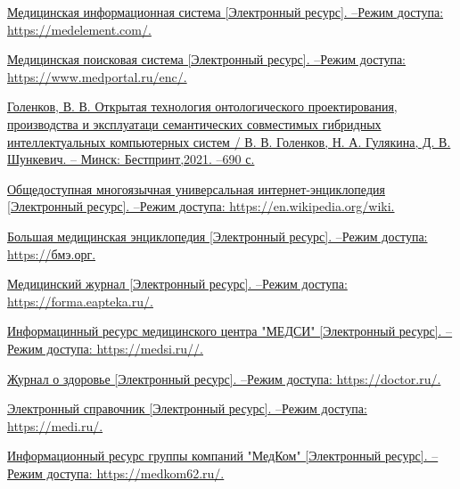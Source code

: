 %
%
%

\begin{thebibliography}{99}
	
	\href{https://medelement.com/}{Медицинская информационная система [Электронный ресурс]. --Режим доступа: https://medelement.com/.}
	
	\href{https://www.medportal.ru/enc/.}{Медицинская поисковая система [Электронный ресурс]. --Режим доступа: https://www.medportal.ru/enc/.}
	
	\href{}{Голенков, В. В. Открытая технология онтологического проектирования, производства и эксплуатаци семантических совместимых гибридных интеллектуальных компьютерных систем / В. В. Голенков, Н. А. Гулякина, Д. В. Шункевич. -- Минск: Бестпринт,2021. --690 с.}
	
	\href{https://en.wikipedia.org/wiki.}{Общедоступная многоязычная универсальная интернет-энциклопедия [Электронный ресурс]. --Режим доступа: https://en.wikipedia.org/wiki.}
	
	\href{https://бмэ.орг.}{Большая медицинская энциклопедия [Электронный ресурс]. --Режим доступа: https://бмэ.орг.}
	
	\href{https://forma.eapteka.ru/}{Медицинский журнал [Электронный ресурс]. --Режим доступа: https://forma.eapteka.ru/.}
	
	\href{https://medsi.ru/}{Информацинный ресурс медицинского центра "МЕДСИ" [Электронный ресурс]. --Режим доступа: https://medsi.ru//.}
	
	\href{https://doctor.ru/}{Журнал о здоровье [Электронный ресурс]. --Режим доступа: https://doctor.ru/.}
	
	\href{https://medi.ru/}{Электронный справочник [Электронный ресурс]. --Режим доступа: https://medi.ru/.}
	
	\href{https://medkom62.ru/}{Информационный ресурс группы компаний "МедКом" [Электронный ресурс]. --Режим доступа: https://medkom62.ru/.}
	
\end{thebibliography}
